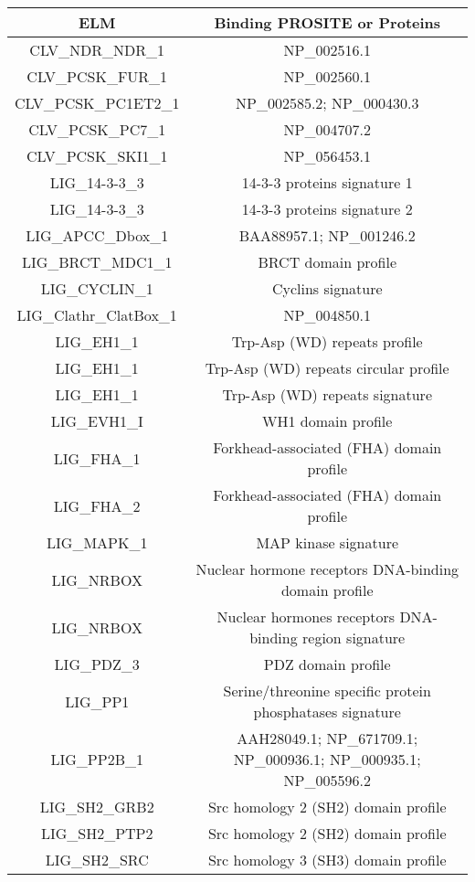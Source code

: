 \begin{table}\footnotesize
\begin{center}
  \begin{tabular}{|c|c|}
  \hline
  ELM &  Binding PROSITE or Proteins \\
  \hline
CLV\_NDR\_NDR\_1 & NP\_002516.1 \\
CLV\_PCSK\_FUR\_1 & NP\_002560.1 \\
CLV\_PCSK\_PC1ET2\_1 & NP\_002585.2; NP\_000430.3 \\
CLV\_PCSK\_PC7\_1 & NP\_004707.2 \\
CLV\_PCSK\_SKI1\_1 & NP\_056453.1 \\
LIG\_14-3-3\_3 & 14-3-3 proteins signature 1 \\
LIG\_14-3-3\_3 & 14-3-3 proteins signature 2 \\
LIG\_APCC\_Dbox\_1 & BAA88957.1; NP\_001246.2 \\
LIG\_BRCT\_MDC1\_1 & BRCT domain profile \\
LIG\_CYCLIN\_1 & Cyclins signature \\
LIG\_Clathr\_ClatBox\_1 & NP\_004850.1 \\
LIG\_EH1\_1 & Trp-Asp (WD) repeats profile \\
LIG\_EH1\_1 & Trp-Asp (WD) repeats circular profile \\
LIG\_EH1\_1 & Trp-Asp (WD) repeats signature \\
LIG\_EVH1\_I & WH1 domain profile \\
LIG\_FHA\_1 & Forkhead-associated (FHA) domain profile \\
LIG\_FHA\_2 & Forkhead-associated (FHA) domain profile \\
LIG\_MAPK\_1 & MAP kinase signature \\
LIG\_NRBOX & Nuclear hormone receptors DNA-binding domain profile \\
LIG\_NRBOX & Nuclear hormones receptors DNA-binding region signature \\
LIG\_PDZ\_3 & PDZ domain profile \\
LIG\_PP1 & Serine/threonine specific protein phosphatases signature \\
LIG\_PP2B\_1 & AAH28049.1; NP\_671709.1; NP\_000936.1; NP\_000935.1; NP\_005596.2 \\
LIG\_SH2\_GRB2 & Src homology 2 (SH2) domain profile \\
LIG\_SH2\_PTP2 & Src homology 2 (SH2) domain profile \\
LIG\_SH2\_SRC & Src homology 3 (SH3) domain profile \\

\end{tabular}
\end{center}
\end{table}
